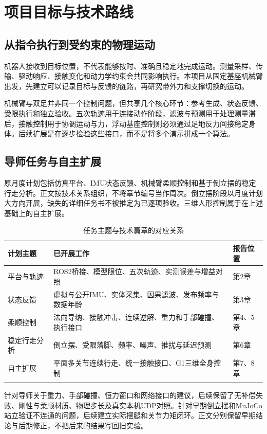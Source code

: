 \chapter{项目目标与技术路线}
\section{从指令执行到受约束的物理运动}
机器人接收到目标位置，不代表能够按时、准确且稳定地完成运动。测量采样、传输、驱动响应、接触变化和动力学约束会共同影响执行。本项目从固定基座机械臂出发，先建立可以记录目标与反馈的链路，再研究带外力和支撑切换的运动。

机械臂与双足并非同一个控制问题，但共享几个核心环节：参考生成、状态反馈、受限执行和独立验收。五次轨迹用于连接动作阶段，滤波与预测用于处理测量滞后，接触控制用于协调运动与力，浮动基座控制则必须通过足地反力间接稳定身体。后续扩展是在逐步检验这些接口，而不是将多个演示拼成一个算法。
\section{导师任务与自主扩展}
原月度计划包括仿真平台、IMU状态反馈、机械臂柔顺控制和基于倒立摆的稳定行走分析。正文按技术关系组织，不将章节编号当作周次。倒立摆阶段以月度计划大方向开展，缺失的详细任务书不被推定为已逐项验收。三维人形控制属于在上述基础上的自主扩展。
\begin{longtable}{p{.19\linewidth}p{.35\linewidth}p{.35\linewidth}}
\toprule 计划主题 & 已开展工作 & 报告位置\\\midrule\endhead
平台与轨迹 & ROS2桥接、模型限位、五次轨迹、实测误差与增益对照 & 第2章\\
状态反馈 & 虚拟与公开IMU、实体采集、因果滤波、发布频率与数据年龄 & 第3章\\
柔顺控制 & 法向导纳、接触冲击、连续逆解、重力和手部碰撞、执行接口 & 第4、5章\\
稳定行走分析 & 倒立摆、受限落脚、频率、噪声、推扰与延迟预测 & 第6章\\
自主扩展 & 平面多关节连续行走、统一接触接口、G1三维全身控制 & 第7、8章\\
\bottomrule\caption{任务主题与技术篇章的对应关系}\end{longtable}

针对导师关于重力、手部碰撞、恒力窗口和网络接口的建议，后续保留了无补偿失败、刚性与柔顺材质、物理步长及真实本机UDP对照。针对早期倒立摆和MuJoCo站立验证不连通的问题，后续建立实际摆腿和关节力矩闭环。正文分别保留早期结论与后期修正，不把后来的结果写回旧实验。
